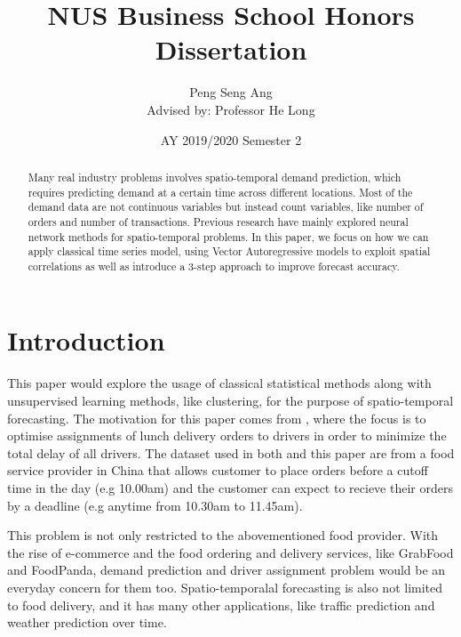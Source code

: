 \documentclass[12pt, letterpaper] {article}
\begin{document}
	\title{NUS Business School Honors Dissertation}
	\author{Peng Seng Ang \\[0.5cm] {Advised by: Professor He Long}}
	\date{AY 2019/2020 Semester 2}
	\maketitle
\begin{abstract}
\noindent Many real industry problems involves spatio-temporal demand prediction, which requires predicting demand at a certain time across different locations. Most of the demand data are not continuous variables but instead count variables, like number of orders and number of transactions. Previous research have mainly explored neural network methods for spatio-temporal problems. In this paper, we focus on how we can apply classical time series model, using Vector Autoregressive models to exploit spatial correlations as well as introduce a 3-step approach to improve forecast accuracy. 

\end{abstract}
\newpage
\section{Introduction}

This paper would explore the usage of classical statistical methods along with unsupervised learning methods, like clustering, for the purpose of spatio-temporal forecasting. The motivation for this paper comes from \cite{Sheng2018}, where the focus is to optimise assignments of lunch delivery orders to drivers in order to minimize the total delay of all drivers. The dataset used in both \cite{Sheng2018} and this paper are from a food service provider in China that allows customer to place orders before a cutoff time in the day (e.g 10.00am) and the customer can expect to recieve their orders by a deadline (e.g anytime from 10.30am to 11.45am). 

\noindent This problem is not only restricted to the abovementioned food provider. With the rise of e-commerce and the food ordering and delivery services, like GrabFood and FoodPanda, demand prediction and driver assignment problem would be an everyday concern for them too. Spatio-temporalal forecasting is also not limited to food delivery, and it has many other applications, like traffic prediction and weather prediction over time. 
\end{document}
